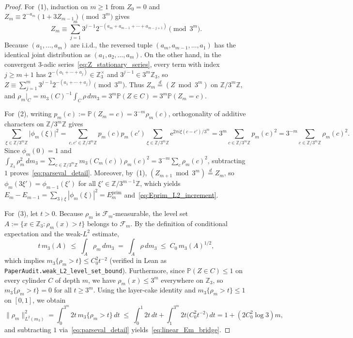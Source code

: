 \documentclass[11pt,a4paper]{article}
\numberwithin{equation}{section}
\theoremstyle{definition}
\theoremstyle{remark}
\newcommand{\Z}{\mathbb{Z}}
\renewcommand{\P}{\mathbb{P}}
\newcommand{\cF}{\mathcal{F}}
\newcommand{\prim}{\mathrm{prim}}
\newcommand{\e}{\mathrm{e}}
\begin{document}
\begin{proof}
For~(1), induction on $m \ge 1$ from $Z_0 = 0$ and $Z_m \equiv 2^{-a_m}(1 + 3 Z_{m-1}) \pmod{3^m}$ gives
\[
 Z_m \equiv \sum_{j=1}^m 3^{j-1} 2^{-(a_m + a_{m-1} + \cdots + a_{m-j+1})} \pmod{3^m}.
\]
Because $(a_1, \dots, a_m)$ are i.i.d., the reversed tuple $(a_m, a_{m-1}, \dots, a_1)$ has the identical joint distribution as $(a_1, a_2, \dots, a_m)$. On the other hand, in the convergent $3$-adic series~\eqref{eq:Z_stationary_series}, every term with index $j \ge m + 1$ has $2^{-(a_1+\cdots+a_j)} \in \Z_3^\times$ and $3^{j-1} \in 3^m\Z_3$, so $Z \equiv \sum_{j=1}^m 3^{j-1} 2^{-(a_1 + \cdots + a_j)} \pmod{3^m}$. Thus $Z_m \stackrel{d}{=} (Z \bmod 3^m)$ on $\Z/3^m\Z$, and $\rho_m|_C = m_3(C)^{-1}\int_C \rho\,dm_3 = 3^m \P(Z \in C) = 3^m \P(Z_m = c)$.

For~(2), writing $p_m(c) := \P(Z_m = c) = 3^{-m}\rho_m(c)$, orthogonality of additive characters on $\Z/3^m\Z$ gives
\[
 \sum_{\xi \in \Z/3^m\Z} \bigl|\phi_m(\xi)\bigr|^2 = \sum_{c, c' \in \Z/3^m\Z} p_m(c)p_m(c') \sum_{\xi \in \Z/3^m\Z} \e^{2\pi i \xi(c - c')/3^m} = 3^m \sum_{c \in \Z/3^m\Z} p_m(c)^2 = 3^{-m}\sum_{c \in \Z/3^m\Z} \rho_m(c)^2.
\]
Since $\phi_m(0) = 1$ and $\int_{\Z_3} \rho_m^2\,dm_3 = \sum_{c \in \Z/3^m\Z} m_3(C_m(c))\rho_m(c)^2 = 3^{-m}\sum_c \rho_m(c)^2$, subtracting $1$ proves~\eqref{eq:parseval_detail}. Moreover, by~(1), $(Z_{m+1} \bmod 3^m) \stackrel{d}{=} Z_m$, so $\phi_m(3\xi') = \phi_{m-1}(\xi')$ for all $\xi' \in \Z/3^{m-1}\Z$, which yields $E_m - E_{m-1} = \sum_{3 \nmid \xi} |\phi_m(\xi)|^2 = E_m^{\prim}$ and~\eqref{eq:Eprim_L2_increment}.

For~(3), let $t > 0$. Because $\rho_m$ is $\cF_m$-measurable, the level set $A := \{x \in \Z_3 : \rho_m(x) > t\}$ belongs to $\cF_m$. By the definition of conditional expectation and the weak-$L^2$ estimate,
\[
 t\,m_3(A) \;\le\; \int_A \rho_m\,dm_3 \;=\; \int_A \rho\,dm_3 \;\le\; C_0\,m_3(A)^{1/2},
\]
which implies $m_3\{\rho_m > t\} \le C_0^2 t^{-2}$ (verified in Lean as \texttt{PaperAudit.weak\_L2\_level\_set\_bound}). Furthermore, since $\P(Z \in C) \le 1$ on every cylinder $C$ of depth $m$, we have $\rho_m(x) \le 3^m$ everywhere on $\Z_3$, so $m_3\{\rho_m > t\} = 0$ for all $t \ge 3^m$. Using the layer-cake identity and $m_3\{\rho_m > t\} \le 1$ on $[0, 1]$, we obtain
\[
 \|\rho_m\|_{L^2(m_3)}^2 = \int_0^{3^m} 2t\,m_3\{\rho_m > t\}\,dt \;\le\; \int_0^1 2t\,dt + \int_1^{3^m} 2t\bigl(C_0^2 t^{-2}\bigr)\,dt = 1 + (2 C_0^2 \log 3)m,
\]
and subtracting $1$ via~\eqref{eq:parseval_detail} yields~\eqref{eq:linear_Em_bridge}.
\end{proof}
\end{document}
